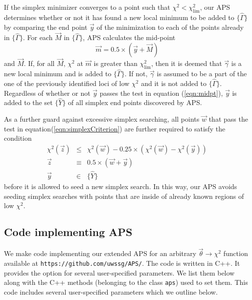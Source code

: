 \documentclass[useAMS,usenatbib]{aastex}
\begin{document}
If the simplex minimizer converges to a point such that
$\chi^2<\chi^2_\text{lim}$, our APS determines whether or not it
has found a new local minimum to be added to $\{\hat{\Gamma}\}$ by comparing the end
point $\vec{y}$ of the minimization to each of the points already in
$\{\hat{\Gamma}\}$.  For each $\vec{M}$ in $\{\hat{\Gamma}\}$, APS calculates the mid-point
\begin{equation}
\label{eqn:midpt}
\vec{m}=0.5\times\left(\vec{y}+\vec{M}\right)
\end{equation}
and $\vec{M}$.  If, for all $\vec{M}$, 
$\chi^2$ at $\vec{m}$ is greater
than $\chi^2_\text{lim}$, then it is deemed that $\vec{\gamma}$ is a new local
minimum and is added to $\{\hat{\Gamma}\}$.  If not, $\vec{\gamma}$ is assumed to be a
part of the one of the previously identified loci of low $\chi^2$ and it is not
added to $\{\hat{\Gamma}\}$.  Regardless of whether or not $\vec{y}$ passes the test in
equation (\ref{eqn:midpt}), $\vec{y}$ is added to the set $\{\hat{Y}\}$ of all
simplex end points discovered by APS.

As a further guard against excessive simplex searching, all points $\vec{w}$ 
that pass the test in equation(\ref{eqn:simplexCriterion}) are further required
to satisfy the condition
\begin{eqnarray}
\chi^2(\vec{z})&\le&\chi^2(\vec{w})-0.25\times\left(\chi^2(\vec{w})-\chi^2(\vec{y})\right)\\
\vec{z}&\equiv&0.5\times\left(\vec{w}+\vec{y}\right)\\
\vec{y}&\in&\{\hat{Y}\}
\end{eqnarray}
before it is allowed to seed a new simplex search.  In this way, our APS avoids seeding simplex
searches with points that are inside of already known regions of low $\chi^2$.

\subsection{Code implementing APS}
\label{sec:user}

We make code implementing our extended APS for 
an arbitrary $\vec{\theta}\rightarrow\chi^2$
function available at \verb|https://github.com/uwssg/APS/|.
The code is written in C++.  It provides the option for several
user-specified parameters.  We list them below along with the C++ 
methods (belonging to the class \verb|aps|) used to set them.  
This code includes several user-specified parameters which we
outline below.
\end{document}
